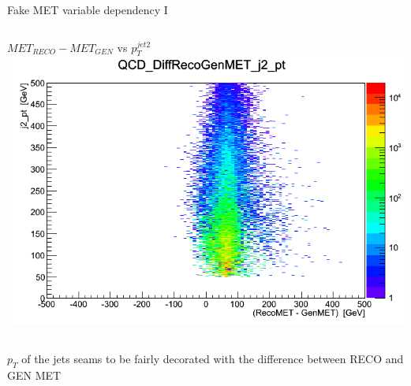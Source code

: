 \documentclass[8pt]{beamer}
\begin{document}
\begin{frame}{Fake MET variable dependency I}
\begin{columns}
\begin{block}{$MET_{RECO}-MET_{GEN}$ vs $p_T^{jet2}$}
\centering
\includegraphics[width=\linewidth]{img/QCD_DiffRecoGenMET_j2_pt.png} 
 
\end{block}

\end{columns}

$p_T$ of the jets seams to be fairly decorated with the difference between RECO and GEN MET 

\end{frame}
\end{document}
